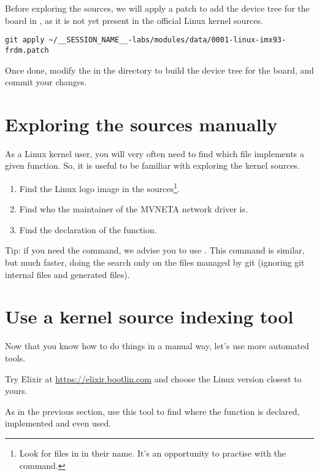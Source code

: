 \if{}
Before exploring the sources, we will apply a patch to add the device
tree for the  board in , as it is not yet present in the official Linux kernel sources.
\begin{verbatim}
git apply ~/__SESSION_NAME__-labs/modules/data/0001-linux-imx93-frdm.patch
\end{verbatim}
Once done, modify the  in the  directory to build
the device tree for the  board, and commit your changes.
\fi

\section{Exploring the sources manually}

As a Linux kernel user, you will very often need to find which file
implements a given function. So, it is useful to be familiar with
exploring the kernel sources.

\begin{enumerate}
\item Find the Linux logo image in the sources\footnote{Look for
      files in  in their name. It's an
      opportunity to practise with the  command.}.
\item Find who the maintainer of the MVNETA network driver is.
\item Find the declaration of the  function.
\end{enumerate}

Tip: if you need the  command, we advise you to use . This command is similar, but much faster, doing the search only
on the files managed by git (ignoring git internal files and generated
files).

\section{Use a kernel source indexing tool}

Now that you know how to do things in a manual way, let's use more
automated tools.

Try Elixir at \url{https://elixir.bootlin.com}
and choose the Linux version closest to yours.

As in the previous section, use this tool to find where
the  function is declared, implemented and
even used.
